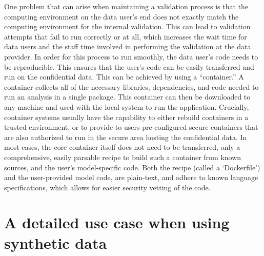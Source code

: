 \documentclass[inline]{hdsr}
\begin{document}
One problem that can arise when maintaining a validation process is that the 
computing environment on the data user's end does not exactly match the computing environment for
the internal validation. This can lead to validation attempts that fail to run correctly or at all, which
increases the wait time for data users and the staff time involved in performing the validation at the data provider. 
In order for this process to run smoothly, the data user's code needs to be reproducible.  This ensures that the user's code can be easily transferred and
run on the confidential data. This can be achieved by using a ``container.'' A container collects all of the
necessary libraries, dependencies, and code needed to run an analysis in a single
package. This container can then be downloaded to any machine and used with the local system to run
the application. Crucially, container systems usually have the capability to either rebuild containers in a trusted environment, or to provide to users pre-configured secure containers that are also authorized to run in the secure area hosting the confidential data. In most cases, the core container itself does not need to be transferred, only a comprehensive, easily parsable recipe to build such a container from known sources, and the user's model-specific code. Both the recipe (called a `Dockerfile') and the user-provided model code, are plain-text, and adhere to known language specifications, which allows for easier security vetting of the code.

\section{A detailed use case when using synthetic data}
\label{sec:usecase}
\end{document}
